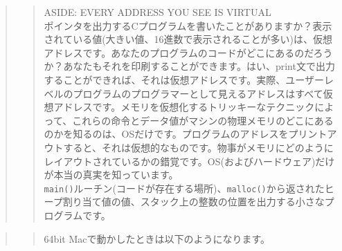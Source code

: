 \begin{quote}
\begin{quote}
ASIDE: EVERY ADDRESS YOU SEE IS VIRTUAL\\
ポインタを出力するCプログラムを書いたことがありますか？表示されている値(大きい値、16進数で表示されることが多い)は、仮想アドレスです。あなたのプログラムのコードがどこにあるのだろうか？あなたもそれを印刷することができます。はい、print文で出力することができれば、それは仮想アドレスです。実際、ユーザーレベルのプログラムのプログラマーとして見えるアドレスはすべて仮想アドレスです。メモリを仮想化するトリッキーなテクニックによって、これらの命令とデータ値がマシンの物理メモリのどこにあるのかを知るのは、OSだけです。プログラムのアドレスをプリントアウトすると、それは仮想的なものです。物事がメモリにどのようにレイアウトされているかの錯覚です。OS(およびハードウェア)だけが本当の真実を知っています。\\
\texttt{main()}ルーチン(コードが存在する場所)、\texttt{malloc()}から返されたヒープ割り当て値の値、スタック上の整数の位置を出力する小さなプログラムです。
\end{quote}
\end{quote}

\begin{Shaded}
\begin{Highlighting}[]
\NormalTok{, (}
\NormalTok{, (}\NormalTok{));}
    \NormalTok{;}
\NormalTok{, (}
\NormalTok{\}}
\end{Highlighting}
\end{Shaded}

\begin{quote}
\begin{quote}
64bit Macで動かしたときは以下のようになります。
\end{quote}
\end{quote}

